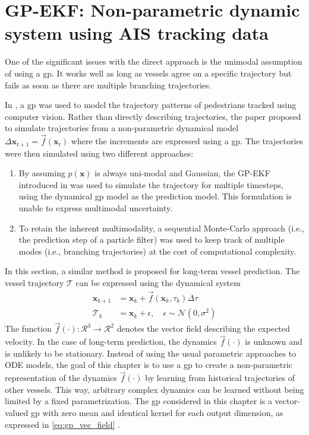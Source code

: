 \chapter{GP-EKF: Non-parametric dynamic system using AIS tracking data}
One of the significant issues with the direct approach is the unimodal assumption of using a \acrshort{gp}. It works well as long as vessels agree on a specific trajectory but fails as soon as there are multiple branching trajectories.

In \cite{pedestrian}, a \acrshort{gp} was used to model the trajectory patterns of pedestrians tracked using computer vision. Rather than directly describing trajectories, the paper proposed to simulate trajectories from a non-parametric dynamical model $\Delta\boldsymbol{x}_{t+1} = \vec{f}(\boldsymbol{x}_t)$ where the increments are expressed using a \acrshort{gp}. The trajectories were then simulated using two different approaches:
\begin{enumerate}
    \item By assuming $p(\boldsymbol{x})$ is always uni-modal and Gaussian, the GP-EKF introduced in \cite{gpekf} was used to simulate the trajectory for multiple timesteps, using the dynamical \acrshort{gp} model as the prediction model. This formulation is unable to express multimodal uncertainty.
    \item To retain the inherent multimodality, a sequential Monte-Carlo approach (i.e., the prediction step of a particle filter) was used to keep track of multiple modes (i.e., branching trajectories) at the cost of computational complexity.
\end{enumerate}

In this section, a similar method is proposed for long-term vessel prediction. The vessel trajectory $\boldsymbol{\mathcal{T}}$ can be expressed using the dynamical system
\begin{subequations}
    \begin{align}
        \boldsymbol{x}_{k+1}       & = \boldsymbol{x}_k + \vec{f}(\boldsymbol{x}_k,\tau_k)\Delta \tau            \\
        \boldsymbol{\mathcal{T}}_k & = \boldsymbol{x}_k + \epsilon, \quad \epsilon \sim \mathcal{N}(0, \sigma^2)
    \end{align}
\end{subequations}
The function $\vec{f}(\cdot): \mathcal{R}^3 \to \mathcal{R}^2$ denotes the vector field describing the expected velocity. In the case of long-term prediction, the dynamics $\vec{f}(\cdot)$ is unknown and is unlikely to be stationary. Instead of using the usual parametric approaches to ODE models, the goal of this chapter is to use a \acrshort{gp} to create a non-parametric representation of the dynamics $\vec{f}(\cdot)$ by learning from historical trajectories of other vessels. This way, arbitrary complex dynamics can be learned without being limited by a fixed parametrization. The \acrshort{gp} considered in this chapter is a vector-valued \acrshort{gp} with zero mean and identical kernel for each output dimension, as expressed in \cref{eq:gp_vec_field} . 


